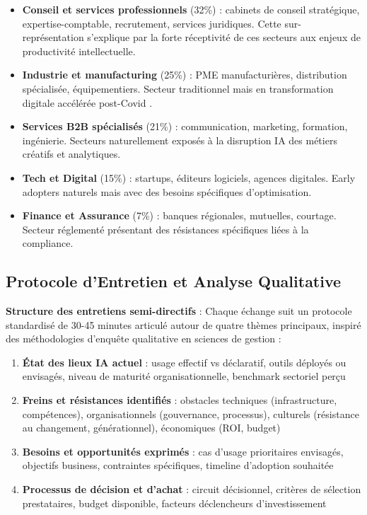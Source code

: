 \begin{itemize}
    \item \textbf{Conseil et services professionnels} (32\%) : cabinets de conseil stratégique, expertise-comptable, recrutement, services juridiques. Cette sur-représentation s'explique par la forte réceptivité de ces secteurs aux enjeux de productivité intellectuelle.
    \item \textbf{Industrie et manufacturing} (25\%) : PME manufacturières, distribution spécialisée, équipementiers. Secteur traditionnel mais en transformation digitale accélérée post-Covid \cite{mckinsey2024industry}.
    \item \textbf{Services B2B spécialisés} (21\%) : communication, marketing, formation, ingénierie. Secteurs naturellement exposés à la disruption IA des métiers créatifs et analytiques.
    \item \textbf{Tech et Digital} (15\%) : startups, éditeurs logiciels, agences digitales. Early adopters naturels mais avec des besoins spécifiques d'optimisation.
    \item \textbf{Finance et Assurance} (7\%) : banques régionales, mutuelles, courtage. Secteur réglementé présentant des résistances spécifiques liées à la compliance.
\end{itemize}

\subsection{Protocole d'Entretien et Analyse Qualitative}

\textbf{Structure des entretiens semi-directifs} : Chaque échange suit un protocole standardisé de 30-45 minutes articulé autour de quatre thèmes principaux, inspiré des méthodologies d'enquête qualitative en sciences de gestion \cite{miles2014qualitative} :

\begin{enumerate}
    \item \textbf{État des lieux IA actuel} : usage effectif vs déclaratif, outils déployés ou envisagés, niveau de maturité organisationnelle, benchmark sectoriel perçu
    \item \textbf{Freins et résistances identifiés} : obstacles techniques (infrastructure, compétences), organisationnels (gouvernance, processus), culturels (résistance au changement, générationnel), économiques (ROI, budget)
    \item \textbf{Besoins et opportunités exprimés} : cas d'usage prioritaires envisagés, objectifs business, contraintes spécifiques, timeline d'adoption souhaitée
    \item \textbf{Processus de décision et d'achat} : circuit décisionnel, critères de sélection prestataires, budget disponible, facteurs déclencheurs d'investissement
\end{enumerate}

